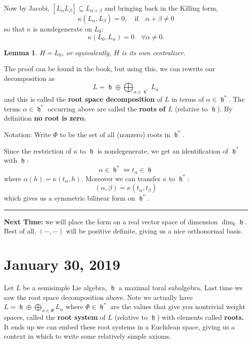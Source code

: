 \documentclass[12pt]{article}
\theoremstyle{nonumberbreak}
\theoremstyle{changebreak}
\newtheorem{lem}[thm]{Lemma}
\theoremstyle{nonumberbreak}
\theoremstyle{change}
\newcommand*{\brk}{
\rule{2in}{.1pt}
}
\DeclareMathOperator{\h}{\mathfrak{h}}
\begin{document}
Now by Jacobi, $[L_\alpha L_\beta]\subseteq L_{\alpha+\beta}$ and bringing back in the Killing form,
\[\kappa(L_\alpha,L_\beta)=0,\quad\text{if}\quad \alpha+\beta\ne 0\]
so that $\kappa$ is nondegenerate on $L_0$:
\[\kappa(L_0,L_\alpha)=0\quad\forall \alpha\ne 0.\]

\begin{lem}
	$H=L_0$, or equivalently, $H$ is its own centralizer.
\end{lem}

The proof can be found in the book, but using this, we can rewrite our decomposition as
\[L=\h\oplus\bigoplus_{\alpha\in\h^*}L_\alpha\]
and this is called the \textbf{root space decomposition} of $L$ in terms of $\alpha\in\h^*$.
The terms $\alpha\in\h^*$  occurring above are called the \textbf{roots of $L$} (relative to $\h$). By definition \textbf{no root is zero.}

Notation: Write $\Phi$ to be the set of all (nonzero) roots in $\h^*$.

Since the restriction of $\kappa$ to $\h$ is nondegenerate, we get an identification of $\h^*$ with $\h$:
\[\alpha\in\h^*\Leftrightarrow t_\alpha\in \h\]
where $\alpha(h)=\kappa(t_\alpha,h)$. Moreover we can transfer $\kappa$ to $\h^*$:
\[(\alpha,\beta)=\kappa(t_\alpha, t_\beta)\]
which gives us a symmetric bilinear form on $\h^*$.

\brk

\textbf{Next Time: } we will place the form on a real vector space of dimension $\dim_k\h$. Best of all, 
$(-,-)$ will be positive definite, giving us a nice orthonormal basis.

\section{January 30, 2019}
Let $L$ be a semisimple Lie algebra, $\h$ a maximal toral subalgebra. Last time we saw the root space decomposition above. Note
we actually have $L=\h\oplus \bigoplus_{\alpha\in\Phi}L_{\alpha}$ where $\Phi\in\h^*$ are the values that give you nontrivial weight spaces,
called the \textbf{root system} of $L$ (relative to $\h$) with elements called \textbf{roots.} It ends up we can embed these root systems in
a Euclidean space, giving us a context in which to write some relatively simple axioms.
\end{document}
